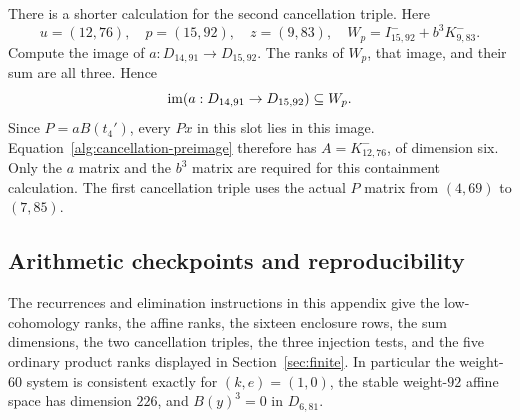 There is a shorter calculation for the second cancellation triple.
Here
\[
 u=(12,76),\quad p=(15,92),\quad z=(9,83),\quad
 W_p=I^-_{15,92}+b^3K^-_{9,83}.
\]
Compute the image of $a:D_{14,91}\to D_{15,92}$.  The ranks of
$W_p$, that image, and their sum are all three.  Hence
\begin{equation}\label{alg:second-factorization}
 \operatorname{im}(a:D_{14,91}\to D_{15,92})\subseteq W_p.
\end{equation}
Since $P=aB(t_4')$, every $Px$ in this slot lies in this image.
Equation~\eqref{alg:cancellation-preimage} therefore has
$A=K^-_{12,76}$, of dimension six.  Only the $a$ matrix and the
$b^3$ matrix are required for this containment calculation.  The
first cancellation triple uses the actual $P$ matrix from $(4,69)$
to $(7,85)$.

\subsection{Arithmetic checkpoints and reproducibility}

\begin{proposition}\label{alg:table-verification}
The recurrences and elimination instructions in this appendix give
the low-cohomology ranks, the affine ranks, the sixteen enclosure rows,
the sum dimensions, the two cancellation triples, the three injection
tests, and the five ordinary product ranks displayed in
Section~\ref{sec:finite}.  In particular the weight-$60$ system is
consistent exactly for $(k,e)=(1,0)$, the stable weight-$92$ affine
space has dimension $226$, and $B(y)^3=0$ in $D_{6,81}$.
\end{proposition}

